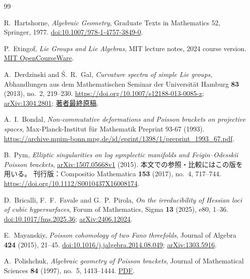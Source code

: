 \begin{thebibliography}{99}
\small
{}
R.~Hartshorne,
\emph{Algebraic Geometry}, Graduate Texts in Mathematics 52,
Springer, 1977.
\href{https://doi.org/10.1007/978-1-4757-3849-0}{doi:10.1007/978-1-4757-3849-0}.

P.~Etingof,
\emph{Lie Groups and Lie Algebras}, MIT lecture notes, 2024 course version.
\href{https://live.ocw.mit.edu/courses/18-755-lie-groups-and-lie-algebras-ii-spring-2024/mit18_755_s24_lec_full.pdf}{MIT OpenCourseWare}.

A.~Derdzinski and \'{S}.~R.~Gal,
\emph{Curvature spectra of simple Lie groups},
Abhandlungen aus dem Mathematischen Seminar der Universit\"at Hamburg
\textbf{83} (2013), no.~2, 219--230.
\url{https://doi.org/10.1007/s12188-013-0085-z};
\href{https://arxiv.org/abs/1304.2801}{arXiv:1304.2801};
\href{https://people.math.osu.edu/derdzinski.1/preprints/amsuh14.pdf}{著者最終原稿}.

A.~I.~Bondal,
\emph{Non-commutative deformations and Poisson brackets on projective spaces},
Max-Planck-Institut f\"ur Mathematik Preprint 93-67 (1993).
\url{https://archive.mpim-bonn.mpg.de/id/eprint/1398/1/preprint_1993_67.pdf}.

B.~Pym,
\emph{Elliptic singularities on log symplectic manifolds and
Feigin--Odesskii Poisson brackets},
\href{https://arxiv.org/abs/1507.05668v1}{arXiv:1507.05668v1} (2015).
本文での参照・比較にはこの版を用いる。
刊行版：Compositio Mathematica \textbf{153} (2017), no.~4, 717--744.
\url{https://doi.org/10.1112/S0010437X16008174}.

D.~Bricalli, F.~F.~Favale and G.~P.~Pirola,
\emph{On the irreducibility of Hessian loci of cubic hypersurfaces},
Forum of Mathematics, Sigma \textbf{13} (2025), e80, 1--36.
\href{https://doi.org/10.1017/fms.2025.36}{doi:10.1017/fms.2025.36};
\href{https://arxiv.org/abs/2406.12024}{arXiv:2406.12024}.

E.~Mayanskiy,
\emph{Poisson cohomology of two Fano threefolds},
Journal of Algebra \textbf{424} (2015), 21--45.
\href{https://doi.org/10.1016/j.jalgebra.2014.08.049}{doi:10.1016/j.jalgebra.2014.08.049};
\href{https://arxiv.org/abs/1303.5916}{arXiv:1303.5916}.

A.~Polishchuk,
\emph{Algebraic geometry of Poisson brackets},
Journal of Mathematical Sciences \textbf{84} (1997), no.~5, 1413--1444.
\href{https://pages.uoregon.edu/apolish/alg-geom-poisson.pdf}{PDF}.


\end{thebibliography}
